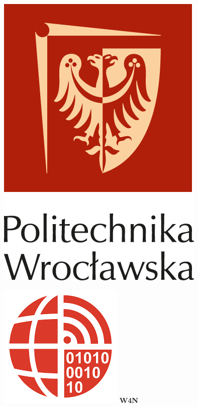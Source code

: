 \documentclass{article}
\begin{document}
\begin{multicols}{3}
    \begin{figure}[H]
        \includegraphics[scale=0.4]{jpg/DOJEBANE_LOGO_PWR.png}
        \label{fig:enter-label}
    \end{figure}
    
    \begin{figure}[H]
    \end{figure}
    
    \begin{figure}[H]
        \includegraphics[scale=0.4]{jpg/w4n.png}
        \centering
        \textbf{W4N}
        \label{fig:WYDZIAŁ INFORMATYKI I TELEKOMUNIKACJI}
    \end{figure}
\end{multicols}
\end{document}
